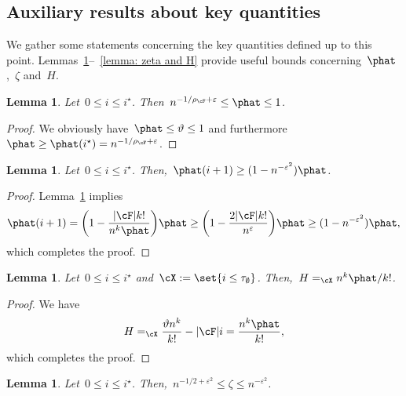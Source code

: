 \documentclass[11pt]{amsart}
\newcommand{\eps}{\varepsilon}
\DeclarePairedDelimiter{\paren}{\lparen}{\rparen}
\DeclarePairedDelimiter{\abs}{\lvert}{\rvert}
\newcommand{\Xeq}{=_{\cX}}
\renewcommand{\theta}{\vartheta}
\newtheorem{lemma}[algocf]{Lemma}
\theoremstyle{definition}
\numberwithin{equation}{section}
\begin{document}
	\subsection{Auxiliary results about key quantities}\label{subsection: key quantities}
	We gather some statements concerning the key quantities defined up to this point.
	Lemmas~\ref{lemma: bounds of phat}--~\ref{lemma: zeta and H} provide useful bounds concerning~$\phat$,~$\zeta$ and~$H$.
	
	\begin{lemma}\label{lemma: bounds of phat}
		Let~$0\leq i\leq i^\star$.
		Then~$n^{-1/\rho_\cF+\eps}\leq \phat\leq 1$.
	\end{lemma}
	
	\begin{proof}
		We obviously have~$\phat\leq \theta\leq 1$ and furthermore~$\phat\geq \phat(i^\star)=n^{-1/\rho_\cF+\eps}$.
	\end{proof}
	
	\begin{lemma}\label{lemma: bounds of delta phat}
		Let~$0\leq i\leq i^\star$.
		Then,~$\phat(i+1)\geq (1-n^{-\eps^2})\phat$.
	\end{lemma}
	
	\begin{proof}
		Lemma~\ref{lemma: bounds of phat} implies
		\begin{equation*}
			\phat(i+1)
			=\paren[\bigg]{1-\frac{\abs{\cF}k!}{n^k\phat}}\phat
			\geq \paren[\bigg]{ 1-\frac{2\abs{\cF}k!}{n^\eps} }\phat
			\geq (1-n^{-\eps^2})\phat,
		\end{equation*}
		which completes the proof.
	\end{proof}

	
	
	\begin{lemma}\label{lemma: edges of H}
		Let~$0\leq i\leq i^\star$ and~$\cX:=\set{i\leq\tau_\emptyset}$.
		Then,~$H\Xeq n^k\phat/k!$.
	\end{lemma}
	
	\begin{proof}
		We have
		\begin{equation*}
			H
			\Xeq \frac{\theta n^k}{k!}-\abs{\cF}i
			=\frac{n^k\phat}{k!},
		\end{equation*}
		which completes the proof.
	\end{proof}
	
	\begin{lemma}\label{lemma: bounds of zeta}
		Let~$0\leq i\leq i^\star$.
		Then,~$n^{-1/2+\eps^2}\leq \zeta\leq n^{-\eps^2}$.
	\end{lemma}
	
\end{document}
